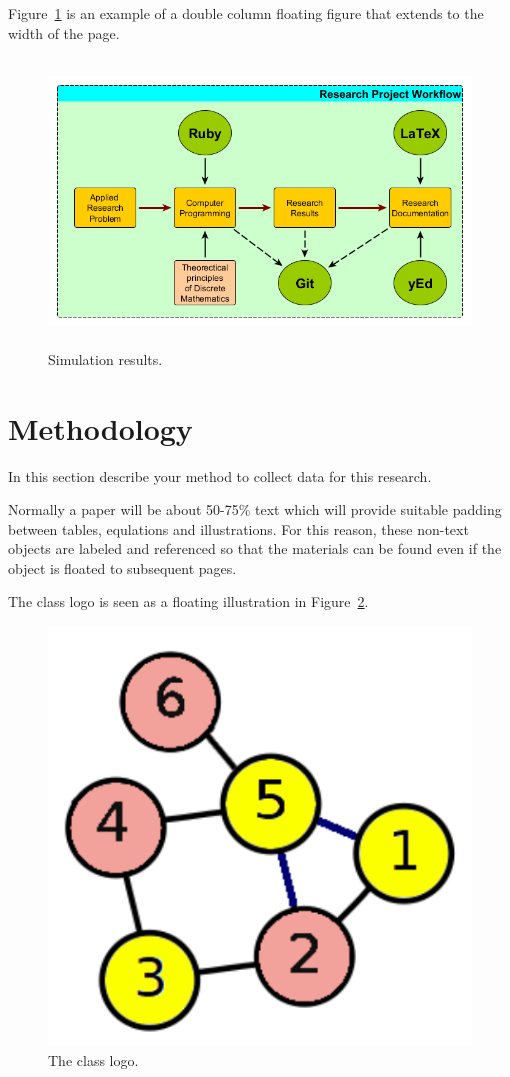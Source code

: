 \documentclass[journal,12pt]{IEEEtran}
\begin{document}
Figure~\ref{fig_doublecolumn} is an example of a double column floating figure that extends to the width of the page.

\begin{figure}[!t]
\centering
\includegraphics[width=\textwidth,height=3in]{img/researchprojectWork.png}%
\caption{Simulation results.}
\label{fig_doublecolumn}
\end{figure}


\section{Methodology}

In this section describe your method to collect data for this research.

Normally a paper will be about 50-75\% text which will provide suitable padding between tables, equlations and illustrations. For this reason, these non-text objects are labeled and referenced so that the materials can be found even if the object is floated to subsequent pages.

The class logo is seen as a floating illustration in Figure~\ref{fig_classlogo}.

\begin{figure}[htb]
\centering
\includegraphics[width=0.5\columnwidth]{img/classlogo.pdf}
\caption{The class logo.}
\label{fig_classlogo}
\end{figure}
\end{document}
